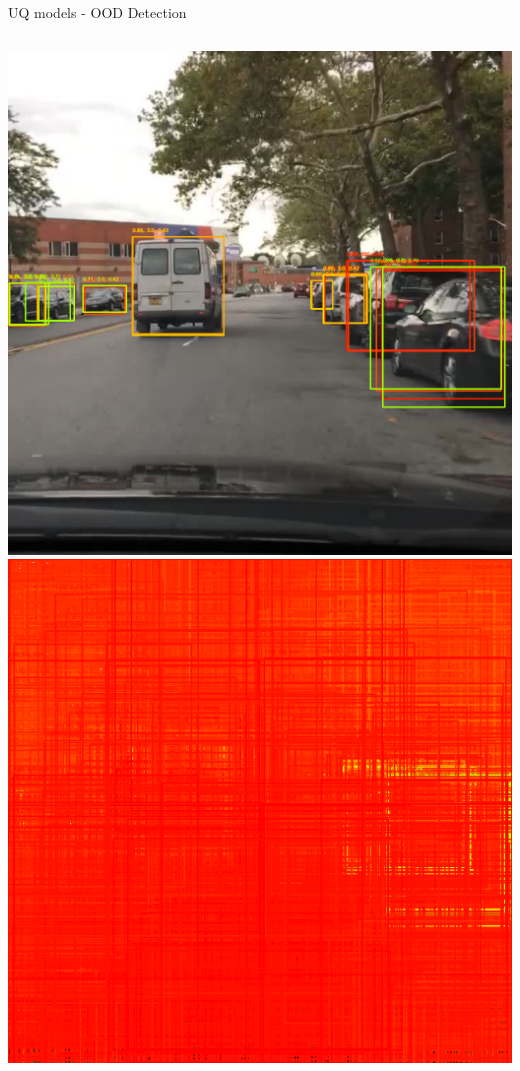 \documentclass[10pt, aspectratio=169]{beamer}
\begin{document}
\begin{frame}[allowframebreaks]{UQ models - OOD Detection}
        \begin{columns}
            \begin{column}{.2\textwidth}
                \includegraphics[width=\textwidth]{images/uq_weathers/BNN_variances2.png}
                \includegraphics[width=\textwidth]{images/uq_weathers/flipout_entropies_all2.png}

\end{column}
\end{columns}
\end{frame}
\end{document}
